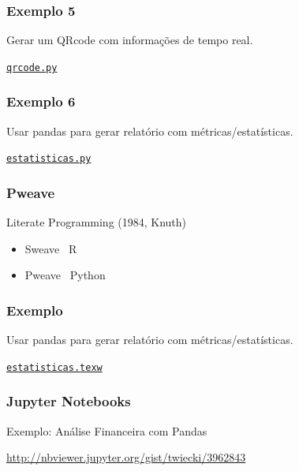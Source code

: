 \documentclass{beamer}
\begin{document}
\begin{frame}
   \frametitle{Exemplo 5}
   Gerar um QRcode com informações de tempo real.
   \begin{center}
      \href{exemplos_codigo/qrcode/qrcode.py}{\tt{qrcode.py}}
   \end{center}
\end{frame}
\begin{frame}
   \frametitle{Exemplo 6}
   Usar pandas para gerar relatório com métricas/estatísticas.
   \begin{center}
      \href{exemplos_codigo/estatisticas/estatisticas.py}{\tt{estatisticas.py}}
   \end{center}
\end{frame}
\begin{frame}
   \frametitle{Pweave}

   \alert{Literate Programming} (1984, Knuth)
   
   \begin{itemize}
      \item Sweave \textemdash\ R
      \item Pweave \textemdash\ Python
   \end{itemize}
\end{frame}
\begin{frame}
   \frametitle{Exemplo}
   Usar pandas para gerar relatório com métricas/estatísticas.
   \begin{center}
      \href{estatisticas.texw}{\tt{estatisticas.texw}}
   \end{center}
\end{frame}
\begin{frame}
   \frametitle{Jupyter Notebooks}
   \vfill
   Exemplo: Análise Financeira com Pandas

   \url{http://nbviewer.jupyter.org/gist/twiecki/3962843}
   \vfill
\end{frame}
\end{document}
